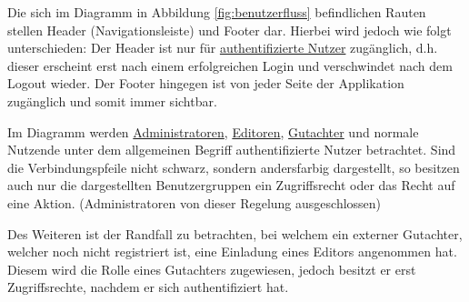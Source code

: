 Die sich im Diagramm in Abbildung \ref{fig:benutzerfluss} befindlichen Rauten stellen Header (Navigationsleiste) und Footer dar.
Hierbei wird jedoch wie folgt unterschieden: Der Header ist nur für \hyperref[glo:regnutzer]{authentifizierte Nutzer} zugänglich,
d.h. dieser erscheint erst nach einem erfolgreichen Login und verschwindet nach dem Logout wieder.
Der Footer hingegen ist von jeder Seite der Applikation zugänglich und somit immer sichtbar.

Im Diagramm werden \hyperref[glo:admin]{Administratoren}, \hyperref[glo:editor]{Editoren}, \hyperref[glo:gutachter]{Gutachter} und normale Nutzende unter dem allgemeinen Begriff
authentifizierte Nutzer betrachtet.
Sind die Verbindungspfeile nicht schwarz, sondern andersfarbig dargestellt, so besitzen auch nur die
dargestellten Benutzergruppen ein Zugriffsrecht oder das Recht auf eine Aktion. (Administratoren von dieser Regelung
ausgeschlossen)

Des Weiteren ist der Randfall zu betrachten, bei welchem ein externer Gutachter, welcher noch nicht registriert ist,
eine Einladung eines Editors angenommen hat.
Diesem wird die Rolle eines Gutachters zugewiesen, jedoch besitzt er erst Zugriffsrechte, nachdem er sich
authentifiziert hat.